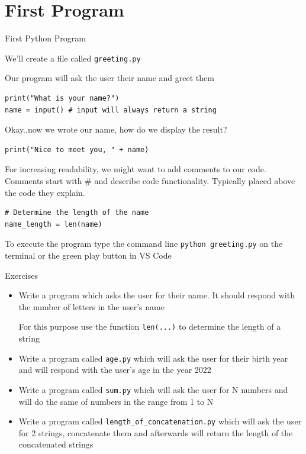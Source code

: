 \documentclass[
	11pt, 
]{beamer}
\begin{document}
\section{First Program}
\small
\begin{frame}[fragile]{First Python Program}

We'll create a file called \texttt{greeting.py}

Our program will ask the user their name and greet them

\pause


\begin{verbatim}
print("What is your name?")
name = input() # input will always return a string
\end{verbatim}

Okay..now we wrote our name, how do we display the result?

\pause
\begin{verbatim}
print("Nice to meet you, " + name)
\end{verbatim}

For increasing readability, we might want to add comments to our code.
Comments start with # and describe code functionality.
Typically placed above the code they explain.

\begin{verbatim}
# Determine the length of the name
name_length = len(name)
\end{verbatim}

To execute the program type the command line \texttt{python greeting.py} on the terminal or the green play button in VS Code
    
\end{frame}



\begin{frame}{Exercises}


\begin{itemize}
    \item Write a program which asks the user for their name. It should respond with the number of letters in the user's name

    For this purpose use the function \texttt{len(...)} to determine the length of a string

    \item Write a program called \texttt{age.py} which will ask the user for their birth year and will respond with the user's age in the year 2022

    \item Write a program called \texttt{sum.py} which will ask the user for N numbers and will do the same of numbers in the range from 1 to N

    \item Write a program called \texttt{length\_of\_concatenation.py} which will ask the user for 2 strings, concatenate them and afterwards will return the length of the concatenated strings
\end{itemize}

\end{frame}
\end{document}
